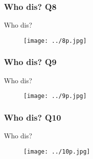 \documentclass{beamer}
\begin{document}
\begin{frame}
\frametitle{Who dis? Q8}
Who dis?
\begin{figure}
\texttt{[image: ../8p.jpg]}
\end{figure}

\end{frame}

\begin{frame}
\frametitle{Who dis? Q9}
Who dis?
\begin{figure}
\texttt{[image: ../9p.jpg]}
\end{figure}

\end{frame}

\begin{frame}
\frametitle{Who dis? Q10}
Who dis?
\begin{figure}
\texttt{[image: ../10p.jpg]}
\end{figure}

\end{frame}
\end{document}
